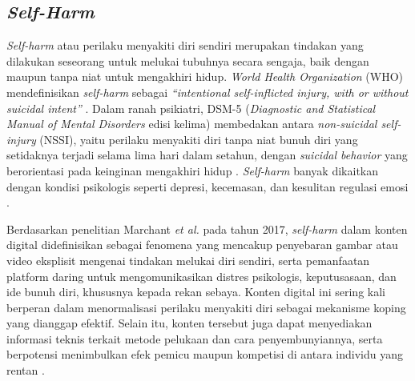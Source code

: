 \subsection{\textit{Self-Harm}} \label{II.teori10}
\textit{Self-harm} atau perilaku menyakiti diri sendiri merupakan tindakan yang dilakukan seseorang untuk melukai tubuhnya secara sengaja, baik dengan maupun tanpa niat untuk mengakhiri hidup. \textit{World Health Organization} (WHO) mendefinisikan \textit{self-harm} sebagai \textit{ ``intentional self-inflicted injury, with or without suicidal intent''} \cite{WHO2014PreventingSuicide}. Dalam ranah psikiatri, DSM-5 (\textit{Diagnostic and Statistical Manual of Mental Disorders} edisi kelima) membedakan antara \textit{non-suicidal self-injury} (NSSI), yaitu perilaku menyakiti diri tanpa niat bunuh diri yang setidaknya terjadi selama lima hari dalam setahun, dengan \textit{suicidal behavior} yang berorientasi pada keinginan mengakhiri hidup \cite{APA2022_DSM5TR}. \textit{Self-harm} banyak dikaitkan dengan kondisi psikologis seperti depresi, kecemasan, dan kesulitan regulasi emosi \cite{Sabrina2023DisregulasiEmosi}.

Berdasarkan penelitian Marchant \textit{et al.} pada tahun 2017, \textit{self-harm} dalam konten digital didefinisikan sebagai fenomena yang mencakup penyebaran gambar atau video eksplisit mengenai tindakan melukai diri sendiri, serta pemanfaatan platform daring untuk mengomunikasikan distres psikologis, keputusasaan, dan ide bunuh diri, khususnya kepada rekan sebaya. Konten digital ini sering kali berperan dalam menormalisasi perilaku menyakiti diri sebagai mekanisme koping yang dianggap efektif. Selain itu, konten tersebut juga dapat menyediakan informasi teknis terkait metode pelukaan dan cara penyembunyiannya, serta berpotensi menimbulkan efek pemicu  maupun kompetisi di antara individu yang rentan \cite{Marchant2017}.

